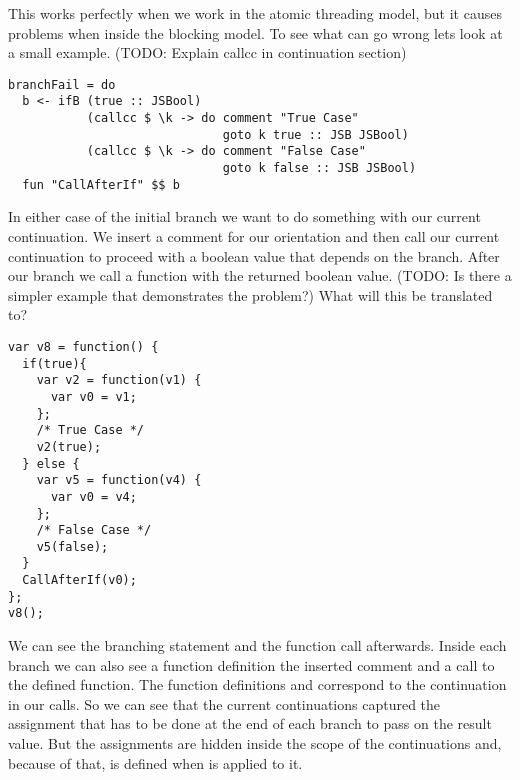 This works perfectly when we work in the atomic threading model,
but it causes problems when inside the blocking model. To 
see what can go wrong lets look at a small example.
(TODO: Explain callcc in continuation section)
\begin{verbatim}
branchFail = do
  b <- ifB (true :: JSBool)
           (callcc $ \k -> do comment "True Case"
                              goto k true :: JSB JSBool)
           (callcc $ \k -> do comment "False Case"
                              goto k false :: JSB JSBool)
  fun "CallAfterIf" $$ b
\end{verbatim}
In either case of the initial branch we want to do something
with our current continuation. We insert a comment for 
our orientation and then call our current continuation to 
proceed with a boolean value that depends on the branch.
After our branch we call a function with the returned boolean value.
(TODO: Is there a simpler example that demonstrates the problem?)
What will this be translated to?
\begin{verbatim}
var v8 = function() {
  if(true){
    var v2 = function(v1) {
      var v0 = v1;
    };
    /* True Case */
    v2(true);
  } else {
    var v5 = function(v4) {
      var v0 = v4;
    };
    /* False Case */
    v5(false);
  }
  CallAfterIf(v0);
};
v8();
\end{verbatim}
We can see the branching statement and the function call afterwards.
Inside each branch we can also see a function definition the inserted 
comment and a call to the defined function. The function definitions 
 and  correspond to the continuation  in 
our  calls. So we can see that the current continuations 
captured the assignment that has to be done at the end of each branch 
to pass on the result value. But the assignments are hidden inside 
the scope of the continuations and, because of that,  is 
defined when  is applied to it.

